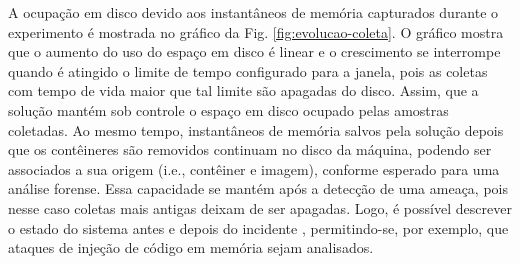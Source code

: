 A ocupação em disco devido aos instantâneos de memória capturados durante o experimento é mostrada no gráfico da Fig. \ref{fig:evolucao-coleta}. 
%
O gráfico mostra que o aumento do uso do espaço em disco é linear e o crescimento se interrompe quando é atingido o limite de tempo configurado para a janela, pois as coletas com tempo de vida maior que tal limite são apagadas do disco. 
%
Assim, que a solução mantém sob controle o espaço em disco ocupado pelas amostras coletadas.
%
Ao mesmo tempo, instantâneos de memória salvos pela solução depois que os contêineres são removidos continuam no disco da máquina, podendo ser associados a sua origem (i.e., contêiner e imagem), conforme esperado para uma análise forense.
%
Essa capacidade se mantém após a detecção de uma ameaça, pois nesse caso coletas mais antigas deixam de ser apagadas.
%
Logo, é possível descrever o estado do sistema antes e depois do incidente \cite{CaseMemoryForensics:2014}, permitindo-se, por exemplo, que ataques de injeção de código em memória sejam analisados.



